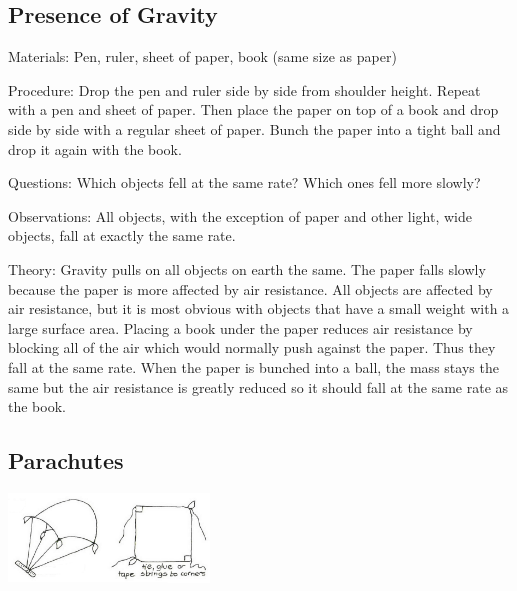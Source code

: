 \begin{multicols}{2}
\subsection{Presence of Gravity}
\begin{description*}
\item[Materials:]{Pen, ruler, sheet of paper, book (same size as paper)}
\item[Procedure:]{Drop the pen and ruler side by side from shoulder height. Repeat with a pen and sheet of paper. Then place the paper on top of a book and drop side by side with a regular sheet of paper. Bunch the paper into a tight ball and drop it again with the book.}
\item[Questions:]{Which objects fell at the same rate? Which ones fell more slowly?}
\item[Observations:]{All objects, with the exception of paper and other light, wide objects, fall at exactly the same rate.}
\item[Theory:]{Gravity pulls on all objects on earth the same.  The paper falls slowly because the paper is more affected by air resistance. All objects are affected by air resistance, but it is most obvious with objects that have a small weight with a large surface area. Placing a book under the paper reduces air resistance by blocking all of the air which would normally push against the paper. Thus they fall at the same rate.  When the paper is bunched into a ball, the mass stays the same but the air resistance is greatly reduced so it should fall at the same rate as the book.}
\end{description*}

\subsection{Parachutes}

\begin{center}
\includegraphics[width=0.4\textwidth]{./img/vso/parachute.png}
\end{center}


\end{multicols}
